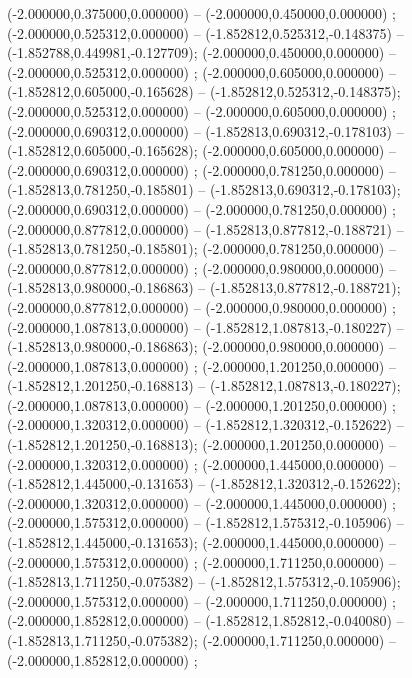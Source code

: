  (-2.000000,0.375000,0.000000) -- (-2.000000,0.450000,0.000000) ;
 (-2.000000,0.525312,0.000000) -- (-1.852812,0.525312,-0.148375) -- (-1.852788,0.449981,-0.127709);
 (-2.000000,0.450000,0.000000) -- (-2.000000,0.525312,0.000000) ;
 (-2.000000,0.605000,0.000000) -- (-1.852812,0.605000,-0.165628) -- (-1.852812,0.525312,-0.148375);
 (-2.000000,0.525312,0.000000) -- (-2.000000,0.605000,0.000000) ;
 (-2.000000,0.690312,0.000000) -- (-1.852813,0.690312,-0.178103) -- (-1.852812,0.605000,-0.165628);
 (-2.000000,0.605000,0.000000) -- (-2.000000,0.690312,0.000000) ;
 (-2.000000,0.781250,0.000000) -- (-1.852813,0.781250,-0.185801) -- (-1.852813,0.690312,-0.178103);
 (-2.000000,0.690312,0.000000) -- (-2.000000,0.781250,0.000000) ;
 (-2.000000,0.877812,0.000000) -- (-1.852813,0.877812,-0.188721) -- (-1.852813,0.781250,-0.185801);
 (-2.000000,0.781250,0.000000) -- (-2.000000,0.877812,0.000000) ;
 (-2.000000,0.980000,0.000000) -- (-1.852813,0.980000,-0.186863) -- (-1.852813,0.877812,-0.188721);
 (-2.000000,0.877812,0.000000) -- (-2.000000,0.980000,0.000000) ;
 (-2.000000,1.087813,0.000000) -- (-1.852812,1.087813,-0.180227) -- (-1.852813,0.980000,-0.186863);
 (-2.000000,0.980000,0.000000) -- (-2.000000,1.087813,0.000000) ;
 (-2.000000,1.201250,0.000000) -- (-1.852812,1.201250,-0.168813) -- (-1.852812,1.087813,-0.180227);
 (-2.000000,1.087813,0.000000) -- (-2.000000,1.201250,0.000000) ;
 (-2.000000,1.320312,0.000000) -- (-1.852812,1.320312,-0.152622) -- (-1.852812,1.201250,-0.168813);
 (-2.000000,1.201250,0.000000) -- (-2.000000,1.320312,0.000000) ;
 (-2.000000,1.445000,0.000000) -- (-1.852812,1.445000,-0.131653) -- (-1.852812,1.320312,-0.152622);
 (-2.000000,1.320312,0.000000) -- (-2.000000,1.445000,0.000000) ;
 (-2.000000,1.575312,0.000000) -- (-1.852812,1.575312,-0.105906) -- (-1.852812,1.445000,-0.131653);
 (-2.000000,1.445000,0.000000) -- (-2.000000,1.575312,0.000000) ;
 (-2.000000,1.711250,0.000000) -- (-1.852813,1.711250,-0.075382) -- (-1.852812,1.575312,-0.105906);
 (-2.000000,1.575312,0.000000) -- (-2.000000,1.711250,0.000000) ;
 (-2.000000,1.852812,0.000000) -- (-1.852812,1.852812,-0.040080) -- (-1.852813,1.711250,-0.075382);
 (-2.000000,1.711250,0.000000) -- (-2.000000,1.852812,0.000000) ;
